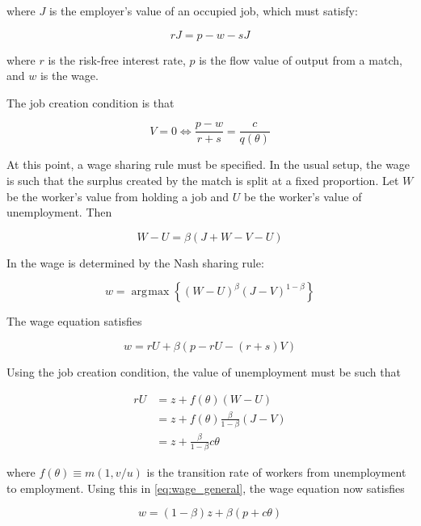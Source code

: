 \documentclass[11pt]{article}
\DeclareMathOperator*{\argmax}{arg\!\max}
\begin{document}
where $J$ is the employer's value of an occupied job, which must satisfy:

\begin{equation}
    rJ = p - w - sJ
\end{equation}

where $r$ is the risk-free interest rate, $p$ is the flow value of output from a match, and $w$ is the wage.

The job creation condition is that

\begin{equation}
    V = 0 \iff \frac{p - w}{r + s} = \frac{c}{q(\theta)}
\end{equation}

At this point, a wage sharing rule must be specified.
In the usual setup, the wage is such that the surplus created by the match is split at a fixed proportion.
Let $W$ be the worker's value from holding a job and $U$ be the worker's value of unemployment.
Then

\begin{equation}
    W - U = \beta ( J + W - V - U)
\end{equation}

In \cite{pissarides_2009} the wage is determined by the Nash sharing rule:

\begin{equation}
    w = \argmax \left\{ (W - U)^\beta (J - V)^{1 - \beta} \right\}
\end{equation}

The wage equation satisfies

\begin{equation} \label{eq:wage_general}
    w = r U + \beta (p - r U - (r + s) V)
\end{equation}

Using the job creation condition, the value of unemployment must be such that

\begin{align}
    rU &= z + f(\theta)(W - U)\\
       &= z + f(\theta)\frac{\beta}{1 - \beta}(J - V)\\
       &=z + \frac{\beta}{1 - \beta}c \theta
\end{align}

where $f(\theta) \equiv m(1, v/u)$ is the transition rate of workers from unemployment to employment.
Using this in \autoref{eq:wage_general}, the wage equation now satisfies

\begin{equation}
    w = (1 - \beta) z + \beta ( p + c \theta )
\end{equation}
\end{document}

